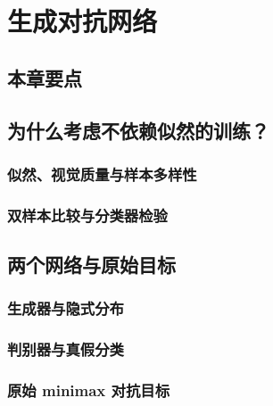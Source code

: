 \chapter{生成对抗网络}
\label{chap:gan}

\section*{本章要点}
\contentplaceholder

\section{为什么考虑不依赖似然的训练？}
\label{sec:gan-motivation}
\contentplaceholder

\subsection{似然、视觉质量与样本多样性}
\label{subsec:gan-evaluation}
\contentplaceholder

\subsection{双样本比较与分类器检验}
\label{subsec:gan-two-sample}
\contentplaceholder

\section{两个网络与原始目标}
\label{sec:gan-objective}
\contentplaceholder

\subsection{生成器与隐式分布}
\label{subsec:gan-generator}
\contentplaceholder

\subsection{判别器与真假分类}
\label{subsec:gan-discriminator}
\contentplaceholder

\subsection{原始 minimax 对抗目标}
\label{subsec:gan-minimax}
\contentplaceholder

